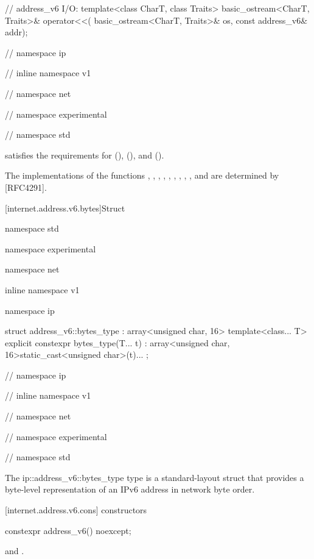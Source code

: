 \begin{codeblock}
{{{{{  // address_v6 I/O:
  template<class CharT, class Traits>
    basic_ostream<CharT, Traits>& operator<<(
      basic_ostream<CharT, Traits>& os, const address_v6& addr);

} // namespace ip
} // inline namespace v1
} // namespace net
} // namespace experimental
} // namespace std
\end{codeblock}

\pnum
{} satisfies the requirements for  (),  (), and  ().

\pnum
\enternote The implementations of the functions , , , , , , , , ,  and  are determined by [RFC4291]. \exitnote


[internet.address.v6.bytes]{Struct }

%
\begin{codeblock}
namespace std {
namespace experimental {
namespace net {
inline namespace v1 {
namespace ip {

  struct address_v6::bytes_type : array<unsigned char, 16>
  {
    template<class... T> explicit constexpr bytes_type(T... t)
      : array<unsigned char, 16>{{static_cast<unsigned char>(t)...}} {}
  };

} // namespace ip
} // inline namespace v1
} // namespace net
} // namespace experimental
} // namespace std
\end{codeblock}

\pnum
The ip::address_v6::bytes_type type is a standard-layout struct that provides a byte-level representation of an IPv6 address in network byte order.



%
[internet.address.v6.cons]{ constructors}

\begin{itemdecl}
constexpr address_v6() noexcept;
\end{itemdecl}

\begin{itemdescr}
\pnum
\postconditions {} and .
\end{itemdescr}

